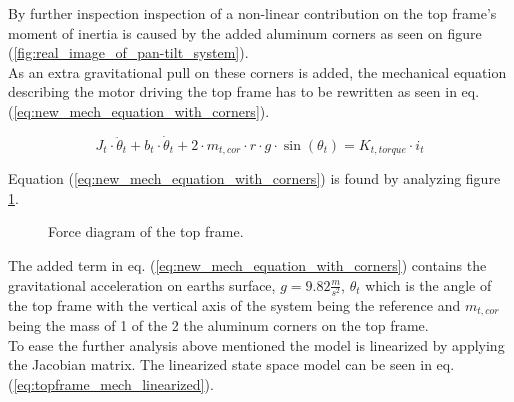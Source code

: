 \documentclass[../../main]{subfiles}
\begin{document}
By further inspection inspection of a non-linear contribution on the top frame's moment of inertia is caused by the added aluminum corners as seen on figure (\ref{fig:real_image_of_pan-tilt_system}).\\
As an extra gravitational pull on these corners is added, the mechanical equation describing the motor driving the top frame has to be rewritten as seen in eq. (\ref{eq:new_mech_equation_with_corners}).

\begin{equation}
  \label{eq:new_mech_equation_with_corners}
  J_t\cdot \ddot \theta_t + b_t\cdot \dot \theta_t + 2\cdot m_{t,cor} \cdot r \cdot g \cdot \sin(\theta_t) = K_{t,torque}\cdot i_t
\end{equation}

Equation (\ref{eq:new_mech_equation_with_corners}) is found by analyzing figure \ref{fig:TrekantDiagramForce}.

\begin{figure}[h]
  \centering
  \def\svgwidth{0.4\columnwidth}
  
  \caption{Force diagram of the top frame.}
  \label{fig:TrekantDiagramForce}
\end{figure}

The added term in eq. (\ref{eq:new_mech_equation_with_corners}) contains the gravitational acceleration on earths surface, $g = 9.82 \si{\frac{m}{s^2}}$, $\theta_t$ which is the angle of the top frame with the vertical axis of the system being the reference and $m_{t,cor}$ being the mass of 1 of the 2 the aluminum corners on the top frame.\\
To ease the further analysis above mentioned the model is linearized by applying the Jacobian matrix. The linearized state space model can be seen in eq. (\ref{eq:topframe_mech_linearized}).
\end{document}
